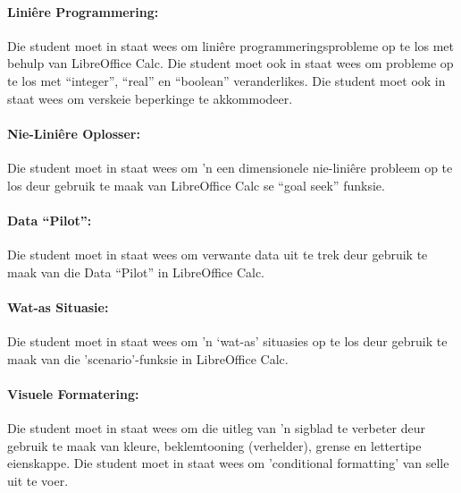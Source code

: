             \paragraph{Lini\^{e}re Programmering:}
                Die student moet in staat wees om lini\^{e}re programmeringsprobleme
                op te los met behulp van LibreOffice Calc. Die student
                moet ook in staat wees om probleme op te los met ``integer'', ``real''
                en ``boolean'' veranderlikes.  Die student moet ook in staat wees om 
                verskeie beperkinge te akkommodeer.

            \paragraph{Nie-Lini\^{e}re Oplosser:}
                Die student moet in staat wees om 'n een dimensionele nie-lini\^{e}re 
                probleem op te los deur gebruik te maak van LibreOffice Calc se 
                ``goal seek'' funksie.

            \paragraph{Data ``Pilot'':}
		Die student moet in staat wees om verwante data uit te trek 
		deur gebruik te maak van die Data ``Pilot'' in LibreOffice Calc.

            \paragraph{Wat-as Situasie:}
                Die student moet in staat wees om 'n `wat-as' situasies op te los 
                deur gebruik te maak van die 'scenario'-funksie  in LibreOffice Calc.

            \paragraph{Visuele Formatering:}
                Die student moet in staat wees om die uitleg van 'n sigblad te verbeter
                deur gebruik te maak van kleure, beklemtooning (verhelder), grense en lettertipe
                eienskappe.  Die student moet in staat wees om 'conditional formatting' 
                van selle uit te voer.